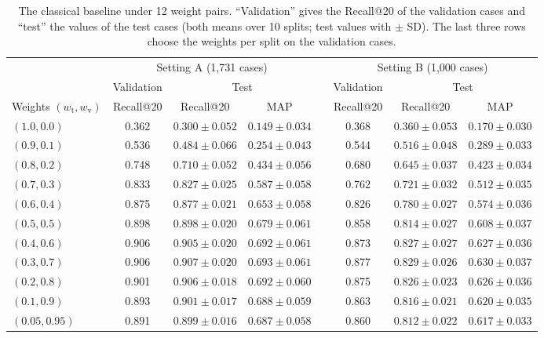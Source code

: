 \begin{table}[h]\centering
\caption{The classical baseline under 12 weight pairs. ``Validation'' gives the Recall@20 of the
validation cases and ``test'' the values of the test cases (both means over 10 splits; test values
with $\pm$ SD). The last three rows choose the weights per split on the validation cases.}
\label{tab:weights}
\scriptsize
\setlength{\tabcolsep}{2.5pt}
\begin{tabular}{@{}lccccccc@{}}
\toprule
 & \multicolumn{3}{c}{Setting A (1,731 cases)} & & \multicolumn{3}{c}{Setting B (1,000 cases)} \\
\cmidrule{2-4}\cmidrule{6-8}
 & Validation & \multicolumn{2}{c}{Test} & & Validation & \multicolumn{2}{c}{Test} \\
\cmidrule{3-4}\cmidrule{7-8}
Weights $(w_{\mathrm{t}}, w_{\mathrm{v}})$ & Recall@20 & Recall@20 & MAP & & Recall@20 & Recall@20 & MAP \\
\midrule
$(1.0, 0.0)$ & 0.362 & $0.300 \pm 0.052$ & $0.149 \pm 0.034$ & & 0.368 & $0.360 \pm 0.053$ & $0.170 \pm 0.030$ \\
$(0.9, 0.1)$ & 0.536 & $0.484 \pm 0.066$ & $0.254 \pm 0.043$ & & 0.544 & $0.516 \pm 0.048$ & $0.289 \pm 0.033$ \\
$(0.8, 0.2)$ & 0.748 & $0.710 \pm 0.052$ & $0.434 \pm 0.056$ & & 0.680 & $0.645 \pm 0.037$ & $0.423 \pm 0.034$ \\
$(0.7, 0.3)$ & 0.833 & $0.827 \pm 0.025$ & $0.587 \pm 0.058$ & & 0.762 & $0.721 \pm 0.032$ & $0.512 \pm 0.035$ \\
$(0.6, 0.4)$ & 0.875 & $0.877 \pm 0.021$ & $0.653 \pm 0.058$ & & 0.826 & $0.780 \pm 0.027$ & $0.574 \pm 0.036$ \\
$(0.5, 0.5)$ & 0.898 & $0.898 \pm 0.020$ & $0.679 \pm 0.061$ & & 0.858 & $0.814 \pm 0.027$ & $0.608 \pm 0.037$ \\
$(0.4, 0.6)$ & 0.906 & $0.905 \pm 0.020$ & $0.692 \pm 0.061$ & & 0.873 & $0.827 \pm 0.027$ & $0.627 \pm 0.036$ \\
$(0.3, 0.7)$ & 0.906 & $0.907 \pm 0.020$ & $0.693 \pm 0.061$ & & 0.877 & $0.829 \pm 0.026$ & $0.630 \pm 0.037$ \\
$(0.2, 0.8)$ & 0.901 & $0.906 \pm 0.018$ & $0.692 \pm 0.060$ & & 0.875 & $0.826 \pm 0.023$ & $0.626 \pm 0.036$ \\
$(0.1, 0.9)$ & 0.893 & $0.901 \pm 0.017$ & $0.688 \pm 0.059$ & & 0.863 & $0.816 \pm 0.021$ & $0.620 \pm 0.035$ \\
$(0.05, 0.95)$ & 0.891 & $0.899 \pm 0.016$ & $0.687 \pm 0.058$ & & 0.860 & $0.812 \pm 0.022$ & $0.617 \pm 0.033$ \\

\end{tabular}
\end{table}
